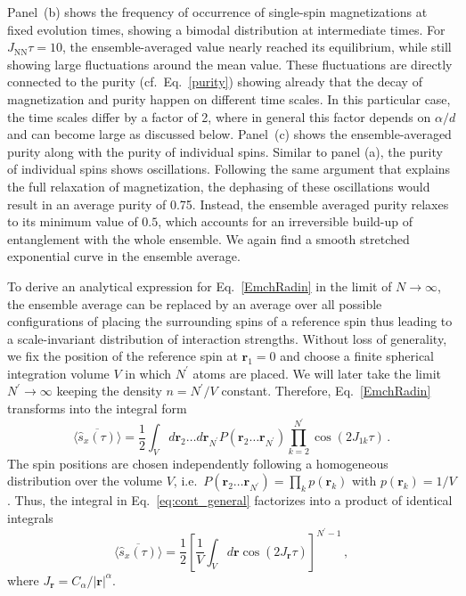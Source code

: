 \documentclass[aps,twocolumn,
superscriptaddress,
footinbib,
prl]{revtex4-1}
\begin{document}
Panel~(b) shows the frequency of occurrence of single-spin magnetizations at fixed evolution times, showing a bimodal distribution at intermediate times. For $J_{\mathrm{NN}}\tau  = 10$, the ensemble-averaged value nearly reached its equilibrium, while still showing large fluctuations around the mean value. These fluctuations are directly connected to the purity (cf.\ Eq.~\eqref{purity}) showing already that the decay of magnetization and purity happen on different time scales. In this particular case, the time scales differ by a factor of 2, where in general this factor depends on $\alpha/d$ and can become large as discussed below. Panel~(c) shows the ensemble-averaged purity along with the purity of individual spins. Similar to panel (a), the purity of individual spins shows oscillations. Following the same argument that explains the full relaxation of magnetization, the dephasing of these oscillations would result in an average purity of 0.75. Instead, the ensemble averaged purity relaxes to its minimum value of $0.5$, which accounts for an irreversible build-up of entanglement with the whole ensemble. We again find a smooth stretched exponential curve in the ensemble average.

To derive an analytical expression for Eq.~\eqref{EmchRadin} in the limit of $N\to \infty$, the ensemble average can be replaced by an average over all possible configurations of placing the surrounding spins of a reference spin \cite{PhysRevA.94.053607, Mukherjee2016AccessingDynamicsb} thus leading to a scale-invariant distribution of interaction strengths. Without loss of generality, we fix the position of the reference spin at $\mathbf{r}_1=0$ and choose a finite spherical integration volume $V$ in which $N^\prime$ atoms are placed. We will later take the limit $N^\prime \to\infty$ keeping the density $n=N^\prime/V$ constant. 
Therefore, Eq.~\eqref{EmchRadin} transforms into the integral form
\begin{equation}
\label{eq:cont_general}
    \overline{\langle \hat{s}_x(\tau) \rangle}  = \frac{1}{2} \int_V  d\mathbf{r}_2\ldots d\mathbf{r}_{N^\prime} P( \mathbf{r}_2\ldots \mathbf{r}_{N^\prime}) \prod_{k=2}^{N^\prime} \cos(2 J_{1k} \tau) \,.
\end{equation}
The spin positions are chosen independently following a homogeneous distribution over the volume $V$, i.e.\ $P( \mathbf{r}_2\ldots \mathbf{r}_{N^\prime}) = \prod_k p(\mathbf{r}_k)$ with $p(\mathbf{r}_k)=1/V$. Thus, the integral in Eq.~\eqref{eq:cont_general} factorizes into a product of identical integrals
\begin{equation}
\label{eq:cont_factored}
    \overline{\langle \hat{s}_x(\tau) \rangle}  = \frac{1}{2} \left[\frac{1}{V}\int_V  d\mathbf{r} \cos(2 J_{\mathbf{r}} \tau)\right]^{N^\prime-1} \,,
\end{equation}
where $J_{\mathbf{r}} = C_\alpha/|\mathbf{r}|^\alpha$.
\end{document}
